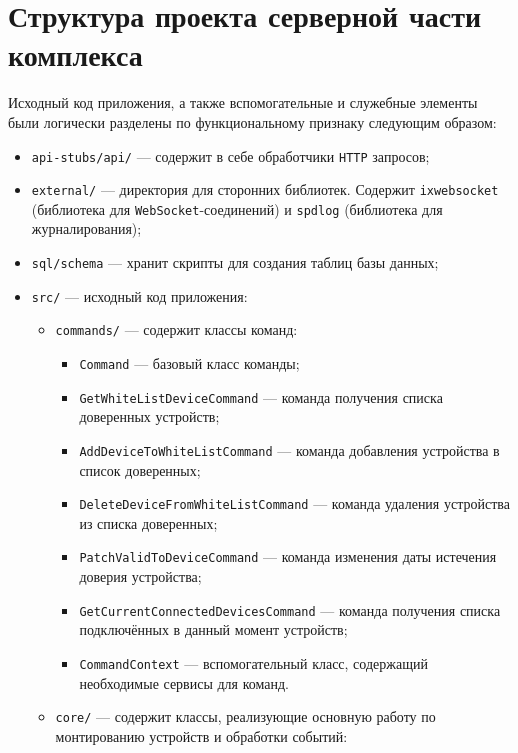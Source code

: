 \section{Структура проекта серверной части комплекса}

Исходный код приложения, а также вспомогательные и служебные элементы были логически 
разделены по функциональному признаку следующим образом:

\begin{itemize}[label=---]
    \item \texttt{api-stubs/api/} --- содержит в себе обработчики \texttt{HTTP} запросов;
    \item \texttt{external/} --- директория для сторонних библиотек. Содержит \texttt{ixwebsocket} 
    (библиотека для \texttt{WebSocket}-соединений) и \texttt{spdlog} (библиотека для журналирования);
    \item \texttt{sql/schema} --- хранит скрипты для создания таблиц базы данных;
    \item \texttt{src/} --- исходный код приложения:
    \begin{itemize}[label=---]
        \item \texttt{commands/} --- содержит классы команд:
        \begin{itemize}[label=---]
            \item \texttt{Command} --- базовый класс команды;
            \item \texttt{GetWhiteListDeviceCommand} --- команда получения списка доверенных устройств;
            \item \texttt{AddDeviceToWhiteListCommand} --- команда добавления устройства в список доверенных;
            \item \texttt{DeleteDeviceFromWhiteListCommand} --- команда удаления устройства из списка доверенных;
            \item \texttt{PatchValidToDeviceCommand} --- команда изменения даты истечения доверия устройства;
            \item \texttt{GetCurrentConnectedDevicesCommand} --- команда получения списка подключённых в данный момент устройств;
            \item \texttt{CommandContext} --- вспомогательный класс, содержащий необходимые сервисы для команд.
        \end{itemize}
        \item \texttt{core/} --- содержит классы, реализующие основную работу по монтированию устройств и обработки событий:
        \begin{itemize}[label=---]

\end{itemize}
\end{itemize}
\end{itemize}
